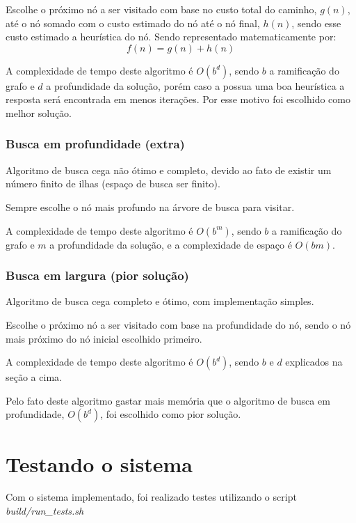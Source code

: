 \documentclass[12pt, a4paper]{article}
\begin{document}
Escolhe o próximo nó a ser visitado com base no custo total do caminho\cite{a_star_computerphile}, \( g(n) \), até o nó somado com o custo estimado do nó até o nó final, \( h(n) \),
sendo esse custo estimado a heurística do nó. Sendo representado matematicamente por\cite{gate_a_star_algorithm}:
\begin{equation}
    f(n) = g(n) + h(n)
\end{equation}

A complexidade de tempo deste algoritmo é \( O(b^d) \), sendo \( b \) a ramificação do grafo e \( d \) a profundidade da solução,
porém caso a possua uma boa heurística a resposta será encontrada em menos iterações. Por esse motivo foi escolhido como melhor solução.

\subsubsection{Busca em profundidade (extra)}\label{sec:bp}
Algoritmo de busca cega não ótimo e completo, devido ao fato de existir um número finito de ilhas (espaço de busca ser finito).

Sempre escolhe o nó mais profundo na árvore de busca para visitar.

A complexidade de tempo deste algoritmo é \( O(b^m) \), sendo \( b \) a ramificação do grafo e \( m \) a profundidade da solução,
e a complexidade de espaço é \( O(bm) \).

\subsubsection{Busca em largura (pior solução)}\label{sec:bl}
Algoritmo de busca cega completo e ótimo, com implementação simples.

Escolhe o próximo nó a ser visitado com base na profundidade do nó,
sendo o nó mais próximo do nó inicial escolhido primeiro.

A complexidade de tempo deste algoritmo é \( O(b^d) \), sendo \( b \) e \( d \) explicados na seção  a cima.

Pelo fato deste algoritmo gastar mais memória que o algoritmo de busca em profundidade, \( O(b^d) \),
foi escolhido como pior solução.

\section{Testando o sistema}\label{sec:testes}
Com o sistema implementado, foi realizado testes utilizando o script \textit{build/run\_tests.sh}
\end{document}
